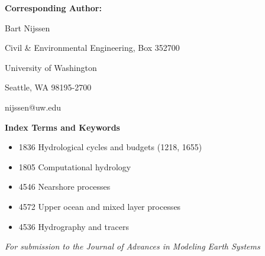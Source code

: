 \textbf{Corresponding Author: }

Bart Nijssen

Civil & Environmental Engineering, Box 352700

University of Washington

Seattle, WA 98195-2700

nijssen@uw.edu

\textbf{Index Terms and Keywords}

\begin{itemize}
\item 1836 Hydrological cycles and budgets (1218, 1655)
\item 1805 Computational hydrology
\item 4546 Nearshore processes
\item 4572 Upper ocean and mixed layer processes
\item 4536 Hydrography and tracers
\end{itemize}

\centerline{\textit{For submission to the Journal of Advances in Modeling Earth Systems}}

\pagebreak
  
  
  
  